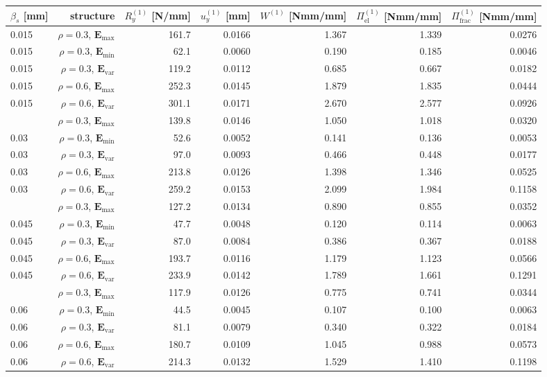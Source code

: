 \begin{tabular}{lrrrrrr}
\toprule
$\beta_s$ [mm] & structure & $R_y^{(1)}$ [N/mm] & $u_y^{(1)}$ [mm] & $W^{(1)}$ [Nmm/mm] & $\Pi_\mathrm{el}^{(1)}$ [Nmm/mm] & $\Pi_\mathrm{frac}^{(1)}$ [Nmm/mm] \\
\midrule
0.015 & $\rho=0.3$, $\mathbf{E}_{\mathrm{max}}$ & 161.7 & 0.0166 & 1.367 & 1.339 & 0.0276 \\
0.015 & $\rho=0.3$, $\mathbf{E}_{\mathrm{min}}$ & 62.1 & 0.0060 & 0.190 & 0.185 & 0.0046 \\
0.015 & $\rho=0.3$, $\mathbf{E}_{\mathrm{var}}$ & 119.2 & 0.0112 & 0.685 & 0.667 & 0.0182 \\
0.015 & $\rho=0.6$, $\mathbf{E}_{\mathrm{max}}$ & 252.3 & 0.0145 & 1.879 & 1.835 & 0.0444 \\
0.015 & $\rho=0.6$, $\mathbf{E}_{\mathrm{var}}$ & 301.1 & 0.0171 & 2.670 & 2.577 & 0.0926 \\
\addlinespace
0.03 & $\rho=0.3$, $\mathbf{E}_{\mathrm{max}}$ & 139.8 & 0.0146 & 1.050 & 1.018 & 0.0320 \\
0.03 & $\rho=0.3$, $\mathbf{E}_{\mathrm{min}}$ & 52.6 & 0.0052 & 0.141 & 0.136 & 0.0053 \\
0.03 & $\rho=0.3$, $\mathbf{E}_{\mathrm{var}}$ & 97.0 & 0.0093 & 0.466 & 0.448 & 0.0177 \\
0.03 & $\rho=0.6$, $\mathbf{E}_{\mathrm{max}}$ & 213.8 & 0.0126 & 1.398 & 1.346 & 0.0525 \\
0.03 & $\rho=0.6$, $\mathbf{E}_{\mathrm{var}}$ & 259.2 & 0.0153 & 2.099 & 1.984 & 0.1158 \\
\addlinespace
0.045 & $\rho=0.3$, $\mathbf{E}_{\mathrm{max}}$ & 127.2 & 0.0134 & 0.890 & 0.855 & 0.0352 \\
0.045 & $\rho=0.3$, $\mathbf{E}_{\mathrm{min}}$ & 47.7 & 0.0048 & 0.120 & 0.114 & 0.0063 \\
0.045 & $\rho=0.3$, $\mathbf{E}_{\mathrm{var}}$ & 87.0 & 0.0084 & 0.386 & 0.367 & 0.0188 \\
0.045 & $\rho=0.6$, $\mathbf{E}_{\mathrm{max}}$ & 193.7 & 0.0116 & 1.179 & 1.123 & 0.0566 \\
0.045 & $\rho=0.6$, $\mathbf{E}_{\mathrm{var}}$ & 233.9 & 0.0142 & 1.789 & 1.661 & 0.1291 \\
\addlinespace
0.06 & $\rho=0.3$, $\mathbf{E}_{\mathrm{max}}$ & 117.9 & 0.0126 & 0.775 & 0.741 & 0.0344 \\
0.06 & $\rho=0.3$, $\mathbf{E}_{\mathrm{min}}$ & 44.5 & 0.0045 & 0.107 & 0.100 & 0.0063 \\
0.06 & $\rho=0.3$, $\mathbf{E}_{\mathrm{var}}$ & 81.1 & 0.0079 & 0.340 & 0.322 & 0.0184 \\
0.06 & $\rho=0.6$, $\mathbf{E}_{\mathrm{max}}$ & 180.7 & 0.0109 & 1.045 & 0.988 & 0.0573 \\
0.06 & $\rho=0.6$, $\mathbf{E}_{\mathrm{var}}$ & 214.3 & 0.0132 & 1.529 & 1.410 & 0.1198 \\
\bottomrule
\end{tabular}
